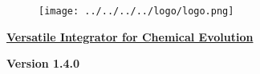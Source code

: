 
\begin{center} 
\begin{figure}[!h] 
\centering 
\texttt{[image: ../../../../logo/logo.png]} 
\end{figure} 
\underline{\LARGE \textbf{Versatile Integrator for Chemical Evolution}} 
\par 
{\Large \textbf{Version 1.4.0}} 
\end{center}
